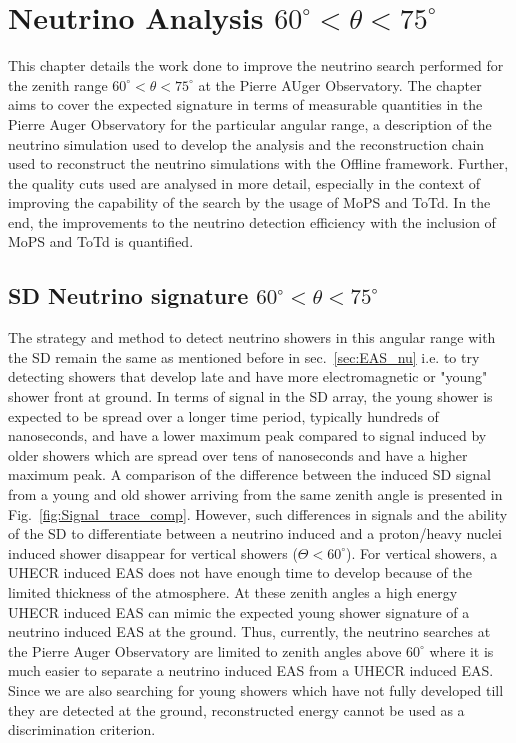 
\chapter{Neutrino Analysis \texorpdfstring{$60^\circ < \theta < 75^\circ$}{}}
\label{chap:DGL}
This chapter details the work done to improve the neutrino search performed for the zenith range $60^\circ < \theta < 75^\circ$ at the Pierre AUger Observatory. The chapter aims to cover the expected signature in terms of measurable quantities in the Pierre Auger Observatory for the particular angular range, a description of the neutrino simulation used to develop the analysis and the reconstruction chain used to reconstruct the neutrino simulations with the Offline framework. Further, the quality cuts used are analysed in more detail, especially in the context of improving the capability of the search by the usage of MoPS and ToTd. In the end, the improvements to the neutrino detection efficiency with the inclusion of MoPS and ToTd is quantified.


\section{SD Neutrino signature \texorpdfstring{$60^{\circ} < \theta < 75^{\circ}$}{}}
\label{sec:sig_DGL}

The strategy and method to detect neutrino showers in this angular range with the SD remain the same as mentioned before in sec.~\ref{sec:EAS_nu} i.e. to try detecting showers that develop late and have more electromagnetic or "young" shower front at ground. In terms of signal in the SD array, the young shower is expected to be spread over a longer time period, typically hundreds of nanoseconds, and have a lower maximum peak compared to signal induced by older showers which are spread over tens of nanoseconds and have a higher maximum peak. A comparison of the difference between the induced SD signal from a young and old shower arriving from the same zenith angle is presented in Fig.~\ref{fig:Signal_trace_comp}. However, such differences in signals and the ability of the SD to differentiate between a neutrino induced and a proton/heavy nuclei induced shower disappear for vertical showers ($\Theta < 60^{\circ}$). For vertical showers, a UHECR induced EAS does not have enough time to develop because of the limited thickness of the atmosphere. At these zenith angles a high energy UHECR induced EAS can mimic the expected young shower signature of a neutrino induced EAS at the ground. Thus, currently, the neutrino searches at the Pierre Auger Observatory are limited to zenith angles above $60^\circ$ where it is much easier to separate a neutrino induced EAS from a UHECR induced EAS. Since we are also searching for young showers which have not fully developed till they are detected at the ground, reconstructed energy cannot be used as a discrimination criterion.

